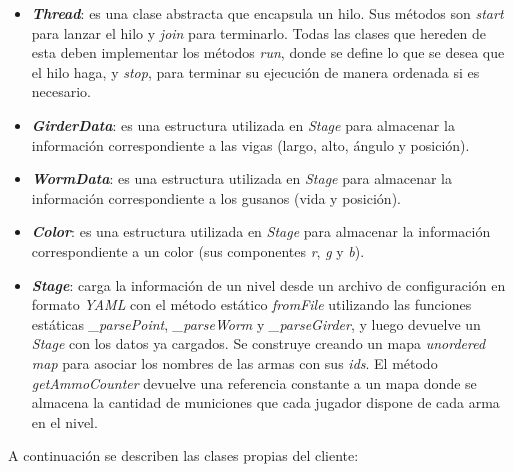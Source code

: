 \begin{itemize}
	\item \textbf{\textit{Thread}}: es una clase abstracta que encapsula un hilo. Sus métodos son \textit{start} para lanzar el hilo y \textit{join} para terminarlo. Todas las clases que hereden de esta deben implementar los métodos \textit{run}, donde se define lo que se desea que el hilo haga, y \textit{stop}, para terminar su ejecución de manera ordenada si es necesario.
	
	\item \textbf{\textit{GirderData}}: es una estructura utilizada en \textit{Stage} para almacenar la información correspondiente a las vigas (largo, alto, ángulo y posición).
	
	\item \textbf{\textit{WormData}}: es una estructura utilizada en \textit{Stage} para almacenar la información correspondiente a los gusanos (vida y posición).
	
	\item \textbf{\textit{Color}}: es una estructura utilizada en \textit{Stage} para almacenar la información correspondiente a un color (sus componentes \textit{r}, \textit{g} y \textit{b}).
	
	\item \textbf{\textit{Stage}}: carga la información de un nivel desde un archivo de configuración en formato \textit{YAML} con el método estático \textit{fromFile} utilizando las funciones estáticas \textit{\_parsePoint}, \textit{\_parseWorm} y \textit{\_parseGirder}, y luego devuelve un \textit{Stage} con los datos ya cargados. Se construye creando un mapa \textit{unordered map} para asociar los nombres de las armas con sus \textit{ids}. El método \textit{getAmmoCounter} devuelve una referencia constante a un mapa donde se almacena la cantidad de municiones que cada jugador dispone de cada arma en el nivel.
\end{itemize}

A continuación se describen las clases propias del cliente:

